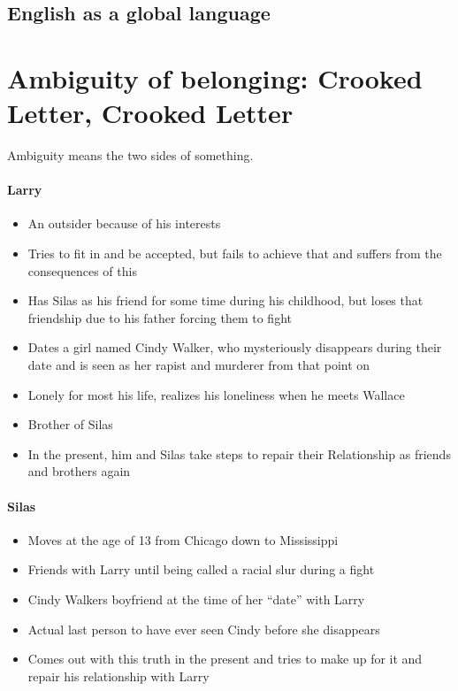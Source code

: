 \documentclass[10pt]{article}
\begin{document}
\subsection{English as a global language}
	\label{ssec:media/english}
\newpage
\section{Ambiguity of belonging: Crooked Letter, Crooked Letter}
	\label{sec:crookedl}
\begin{definition}
Ambiguity means the two sides of something.
\end{definition}

\paragraph{Larry}
\begin{itemize}
\item An outsider because of his interests
\item Tries to fit in and be accepted, but fails to achieve that and suffers from the consequences of this
\item Has Silas as his friend for some time during his childhood, but loses that friendship due to his father forcing them to fight
\item Dates a girl named Cindy Walker, who mysteriously disappears during their date and is seen as her rapist and murderer from that point on
\item Lonely for most his life, realizes his loneliness when he meets Wallace
\item Brother of Silas
\item In the present, him and Silas take steps to repair their Relationship as friends and brothers again
\end{itemize}

\paragraph{Silas}
\begin{itemize}
\item Moves at the age of 13 from Chicago down to Mississippi
\item Friends with Larry until being called a racial slur during a fight
\item Cindy Walkers boyfriend at the time of her \enquote{date} with Larry
\item Actual last person to have ever seen Cindy before she disappears
\item Comes out with this truth in the present and tries to make up for it and repair his relationship with Larry
\end{itemize}
\end{document}
